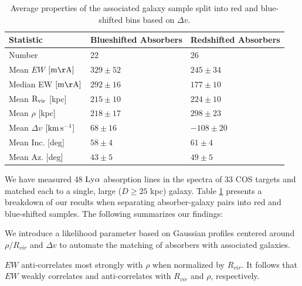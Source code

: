 \documentclass[twocolumn,tighten]{aastex6}
\begin{document}
\begin{table}[ht]\footnotesize
\begin{center}
\begin{tabular}{l l l}
 \hline \hline
 Statistic                				&  Blueshifted Absorbers   &     Redshifted Absorbers     \\ 
  \hline \hline
 Number 	          			 		&     	22				&	26			\\
 Mean $EW$    \scriptsize $\rm [m\AA]$    &	$329 \pm 52$ 		&	$245 \pm 34$  	\\
 Median EW     \scriptsize $\rm [m\AA]$    & 	$292 \pm 16$		& 	$177 \pm 10$	\\
 Mean $\rm R_{vir}$   \scriptsize [kpc]	&   	$215 \pm 10$		& 	$224 \pm 10$	\\
 Mean $\rho$   \scriptsize [kpc]          		&   	$218 \pm 17$ 		& 	$298 \pm 23$	\\
 Mean $\Delta v$  \scriptsize $\rm [km\, s^{-1}]$     &	$ 68 \pm 16$    &	$-108 \pm 20$	\\
 Mean Inc.  \scriptsize [deg]  			&  	$58 \pm 4$		&	$61 \pm 4$	\\
 Mean Az.  \scriptsize [deg]    			&	$43 \pm 5$ 		&	$49 \pm 5$ 	\\
  
\hline
\end{tabular}
\end{center}
  \caption{\small{Average properties of the associated galaxy sample split into red and blue-shifted bins based on $\Delta v$.}}
  \label{resultsTable}
\end{table}

We have measured 48 $\rm Ly\alpha$ absorption lines in the spectra of 33 COS targets and matched each to a single, large ($D\geq 25$ kpc) galaxy. Table \ref{resultsTable} presents a breakdown of our results when separating absorber-galaxy pairs into red and blue-shifted samples. The following summarizes our findings:

\vspace{10pt}

\indent \textbullet \indent We introduce a likelihood parameter based on Gaussian profiles centered around $\rho / R_{vir}$ and $\Delta v$ to automate the matching of absorbers with associated galaxies. 

\vspace{10pt}

\indent \textbullet \indent $EW$ anti-correlates most strongly with $\rho$ when normalized by $R_{vir}$. It follows that $EW$ weakly correlates and anti-correlates with $R_{vir}$ and $\rho$, respectively.
\end{document}
